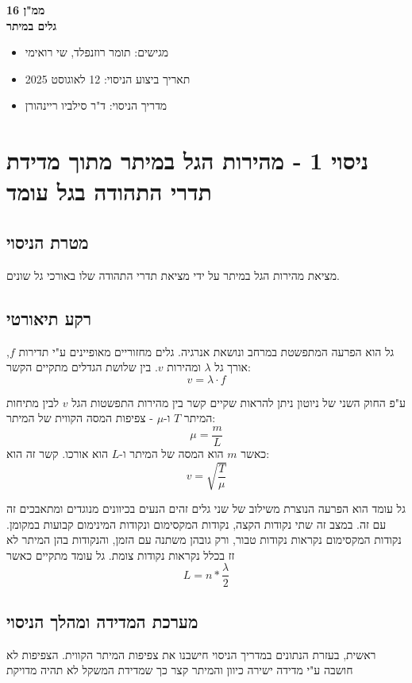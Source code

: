 \documentclass[14pt]{extarticle}
\begin{document}
\begin{center}
    {\LARGE \textbf{ממ"ן 16}}\\
    {\textbf{גלים במיתר}}
\end{center}

\begin{itemize}
    \item מגישים: תומר רוזנפלד, שי רואימי
    \item תאריך ביצוע הניסוי: 12 לאוגוסט 2025
    \item מדריך הניסוי: ד"ר סילביו ריינהורן
\end{itemize}
\newpage
\section*{ניסוי 1 - מהירות הגל במיתר מתוך מדידת תדרי התהודה בגל עומד}
\subsection*{מטרת הניסוי}
מציאת מהירות הגל במיתר על ידי מציאת תדרי התהודה שלו באורכי גל שונים.
\subsection*{רקע תיאורטי}
גל הוא הפרעה המתפשטת במרחב ונושאת אנרגיה. גלים מחזוריים מאופיינים ע"י תדירות $f$, אורך גל $\lambda$ ומהירות $v$. בין שלושת הגדלים מתקיים הקשר:
\begin{equation}
    v = \lambda \cdot f
\end{equation}

ע"פ החוק השני של ניוטון ניתן  להראות שקיים קשר בין מהירות  התפשטות הגל $v$ לבין מתיחות המיתר $T$ ו-\( \mu \) - צפיפות המסה הקווית של המיתר:
\begin{equation}
    \mu = \frac{m}{L}
\end{equation}
כאשר \(m\) הוא המסה של המיתר ו-\(L\) הוא אורכו. קשר זה הוא:
\begin{equation}
    v = \sqrt{\frac{T}{\mu}}
\end{equation}

גל עומד הוא הפרעה הנוצרת משילוב של שני גלים זהים הנעים בכיוונים מנוגדים ומתאבכים זה עם זה.
במצב זה שתי נקודות הקצה, נקודות המקסימום ונקודות המינימום קבועות במקומן.
נקודות המקסימום נקראות נקודות טבור, ורק גובהן משתנה עם הזמן, והנקודות בהן המיתר לא זז בכלל נקראות נקודות צומת. גל עומד מתקיים כאשר
\begin{equation}
    L=n*\frac{\lambda}{2}
\end{equation}

\subsection*{מערכת המדידה ומהלך הניסוי}
ראשית, בעזרת הנתונים במדריך הניסוי חישבנו את צפיפות המיתר הקווית. הצפיפות לא חושבה ע"י  מדידה ישירה כיוון  והמיתר קצר כך שמדידת  המשקל לא תהיה מדויקת
\end{document}
